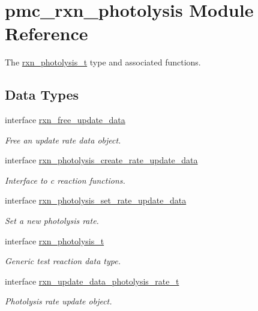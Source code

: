 \hypertarget{namespacepmc__rxn__photolysis}{}\section{pmc\+\_\+rxn\+\_\+photolysis Module Reference}
\label{namespacepmc__rxn__photolysis}


The \mbox{\hyperlink{structpmc__rxn__photolysis_1_1rxn__photolysis__t}{rxn\+\_\+photolysis\+\_\+t}} type and associated functions.  


\subsection*{Data Types}
\begin{DoxyCompactItemize}
\item 
interface \mbox{\hyperlink{interfacepmc__rxn__photolysis_1_1rxn__free__update__data}{rxn\+\_\+free\+\_\+update\+\_\+data}}
\begin{DoxyCompactList}\small\item\em Free an update rate data object. \end{DoxyCompactList}\item 
interface \mbox{\hyperlink{interfacepmc__rxn__photolysis_1_1rxn__photolysis__create__rate__update__data}{rxn\+\_\+photolysis\+\_\+create\+\_\+rate\+\_\+update\+\_\+data}}
\begin{DoxyCompactList}\small\item\em Interface to c reaction functions. \end{DoxyCompactList}\item 
interface \mbox{\hyperlink{interfacepmc__rxn__photolysis_1_1rxn__photolysis__set__rate__update__data}{rxn\+\_\+photolysis\+\_\+set\+\_\+rate\+\_\+update\+\_\+data}}
\begin{DoxyCompactList}\small\item\em Set a new photolysis rate. \end{DoxyCompactList}\item 
interface \mbox{\hyperlink{structpmc__rxn__photolysis_1_1rxn__photolysis__t}{rxn\+\_\+photolysis\+\_\+t}}
\begin{DoxyCompactList}\small\item\em Generic test reaction data type. \end{DoxyCompactList}\item 
interface \mbox{\hyperlink{structpmc__rxn__photolysis_1_1rxn__update__data__photolysis__rate__t}{rxn\+\_\+update\+\_\+data\+\_\+photolysis\+\_\+rate\+\_\+t}}
\begin{DoxyCompactList}\small\item\em Photolysis rate update object. \end{DoxyCompactList}\end{DoxyCompactItemize}
